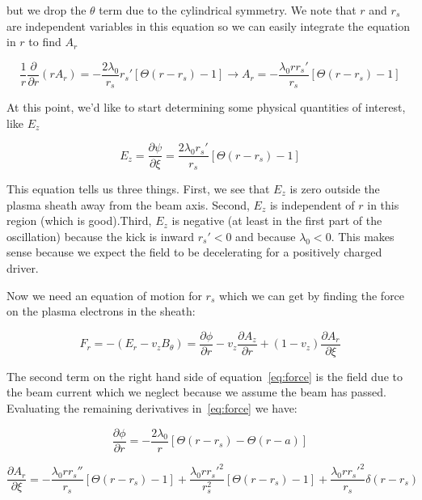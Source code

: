 \documentclass[aps,prl,preprint,groupedaddress]{revtex4-1}
\begin{document}
but we drop the $\theta$ term due to the cylindrical symmetry. We note that $r$ and $r_s$ are independent variables in this equation so we can easily integrate the equation in $r$ to find $A_r$

\begin{equation}\label{eq:a_r}
\frac{1}{r}\frac{\partial}{\partial r} (r A_r) = -\frac{2\lambda_0}{r_s}r_s'\left[\Theta(r-r_s)-1\right] \rightarrow A_r = -\frac{\lambda_0 r r_s'}{r_s}\left[\Theta(r-r_s)-1\right] 
\end{equation}

At this point, we'd like to start determining some physical quantities of interest, like $E_z$

\begin{equation}\label{eq:E_z}
E_z = \frac{\partial \psi}{\partial \xi} = \frac{2\lambda_0 r_s'}{r_s}\left[\Theta(r-r_s)-1\right] 
\end{equation}

This equation tells us three things. First, we see that $E_z$ is zero outside the plasma sheath away from the beam axis. Second, $E_z$ is independent of $r$ in this region (which is good).Third, $E_z$ is negative (at least in the first part of the oscillation) because the kick is inward $r_s' < 0$ and because $\lambda_0 < 0$. This makes sense because we expect the field to be decelerating for a positively charged driver. 

Now we need an equation of motion for $r_s$ which we can get by finding the force on the plasma electrons in the sheath:

\begin{equation}\label{eq:force}
F_r =-(E_r -v_z B_{\theta}) = \frac{\partial \phi}{\partial r} - v_z\frac{\partial A_z}{\partial r} + (1-v_z)\frac{\partial A_r}{\partial \xi}
\end{equation}

The second term on the right hand side of equation~\ref{eq:force} is the field due to the beam current which we neglect because we assume the beam has passed. Evaluating the remaining derivatives in~\ref{eq:force} we have:

\begin{equation}\label{dphi}
\frac{\partial \phi}{\partial r} = -\frac{2\lambda_0}{r}\left[\Theta(r-r_s)-\Theta(r-a)\right]
\end{equation}

\begin{equation}\label{dA_r}
\frac{\partial A_r}{\partial \xi} = -\frac{\lambda_0 r r_s''}{r_s}\left[\Theta(r-r_s)-1\right] + \frac{\lambda_0 r r_s'^2}{r_s^2}\left[\Theta(r-r_s)-1\right] + \frac{\lambda_0 r r_s'^2}{r_s}\delta(r-r_s)
\end{equation}
\end{document}
